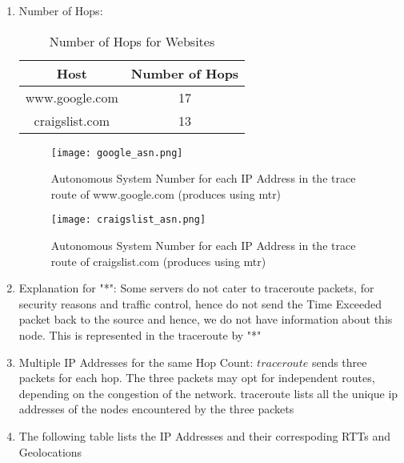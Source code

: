 \documentclass[12pt]{article}
\begin{document}
\begin{enumerate}
    \item Number of Hops:
    \begin{table}[h!]
        \centering
        \caption{Number of Hops for Websites}
        \begin{tabular}{|c|c|}
            \hline
            Host & Number of Hops \\
            \hline
            www.google.com & 17 \\
            craigslist.com & 13 \\
            \hline
        \end{tabular}
    \end{table}
    \begin{figure}[h!]
        \centering
        \texttt{[image: google\_asn.png]}
        \caption{Autonomous System Number for each IP Address in the trace route of www.google.com (produces using mtr)}
    \end{figure}
    \begin{figure}[h!]
        \centering
        \texttt{[image: craigslist\_asn.png]}
        \caption{Autonomous System Number for each IP Address in the trace route of craigslist.com (produces using mtr)}
    \end{figure}
    \item Explanation for "*": Some servers do not cater to traceroute packets, for security reasons and traffic control, hence do not send the Time Exceeded packet back to the source and hence, we do not have information about this node. This is represented in the traceroute by "*"
    \item Multiple IP Addresses for the same Hop Count: $traceroute$ sends three packets for each hop. The three packets may opt for independent routes, depending on the congestion of the network. traceroute lists all the unique ip addresses of the nodes encountered by the three packets
    \item The following table lists the IP Addresses and their correspoding RTTs and Geolocations
    \begin{table}[h!]
        \centering
        \caption{IP Addresses and their GeoLocations for www.google.com}
\end{table}
\end{enumerate}
\end{document}

